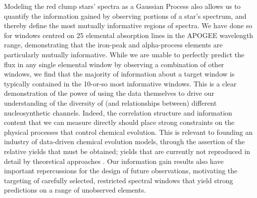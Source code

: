 \documentclass[a4paper,fleqn,usenatbib]{mnras}
\newcommand{\mkn}[1]{\textbf{\textcolor{red}{MKN: #1}}}
\begin{document}


Modeling the red clump stars' spectra as a Gaussian Process also allows us to quantify the information gained by observing portions of a star's spectrum, and thereby define the most mutually informative regions of spectra. We have done so for windows centred on 25 elemental absorption lines in the APOGEE wavelength range, demonstrating that the iron-peak and alpha-process elements are particularly mutually informative. While we are unable to perfectly predict the flux in any single elemental window by observing a combination of other windows, we find that the majority of information about a target window is typically contained in the 10-or-so most informative windows. This is a clear demonstration of the power of using the data themselves to drive our understanding of the diversity of (and relationships between) different nucleosynthetic channels. Indeed, the correlation structure and information content that we can measure directly should place strong constraints on the physical processes that control chemical evolution. This is relevant to founding an industry of data-driven chemical evolution models, through the assertion of the relative yields that must be obtained; yields that are currently not reproduced in detail by theoretical approaches \citep[e.g.][and Blancato, submitted, 2019]{Jan2017}. Our information gain results also have important repercussions for the design of future observations, motivating the targeting of carefully selected, restricted spectral windows that yield strong predictions on a range of unobserved elements.
\end{document}

